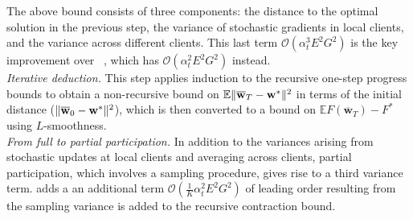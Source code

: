 The above bound consists of three components: the distance to the optimal solution 
in the previous step, 
the variance of stochastic gradients in local clients, and the variance
across different clients. This last term $\mathcal{O}(\alpha_{t}^{3}E^{2}G^{2})$ is the key improvement over ~\cite{li2019convergence}, which has $\mathcal{O}(\alpha_{t}^{2}E^2 G^2)$ instead.\\
\textit{Iterative deduction.} This step applies induction to the recursive one-step progress bounds to obtain a non-recursive bound on $\mathbb{E}\|{\overline{\mathbf{w}}}_{T}-{\mathbf{w}}^{\ast}\|^{2}$ in terms of the initial distance ($\|{\overline{\mathbf{w}}}_{0}-{\mathbf{w}}^{\ast}\|^{2}$), which is then converted to a bound on $\mathbb{E}F(\overline{\mathbf{w}}_{T})-F^{\ast}$ using $L$-smoothness.\\
\textit{From full to partial participation.} In addition to the variances arising from stochastic updates at local clients and averaging across clients, partial participation, which involves a sampling procedure, gives rise to a third variance term. adds a an additional term $\mathcal{O}(\frac{1}{K} \alpha_t^2 E^2G^2)$ of leading order resulting from the sampling variance is added to the recursive contraction bound.

\begin{comment}
A crucial ingredient in the proof of Theorem~\ref{th:scvx_sgd} is a one step contraction bound 
	\begin{align*}
	\mathbb{E}\|\ov{w}_{t+1}-\vw^{\ast}\|^{2} & \leq(1-\mu\alpha_{t})\mathbb{E}\|\ov{w}_{t}-\vw^{\ast}\|^{2}+\alpha_{t}^{2}\frac{1}{N}\nu_{max}^{2}\sigma^{2}+6E^{2}L\alpha_{t}^{3}G^{2} 
	\end{align*}
that improves upon the analysis in~\cite{li2019convergence} to deliver the linear speedup. Moreover, analogues of this bound appear in the analyses of the convex setting as well as the Nesterov accelerated FedAvg.\\
\end{comment}


